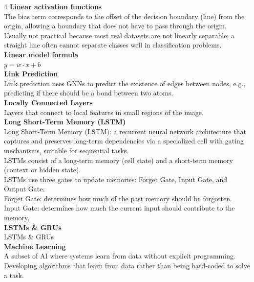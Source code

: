 \documentclass[8pt]{extarticle}
\begin{document}
\begin{multicols}{4}
{\vspace{2pt}\textbf{Linear activation functions}\\
The bias term corresponds to the offset of the decision boundary (line) from the origin, allowing a boundary that does not have to pass through the origin.\\
Usually not practical because most real datasets are not linearly separable; a straight line often cannot separate classes well in classification problems.\\
\vspace{2pt}\textbf{Linear model formula}\\
$y = w\cdot x + b$\\
\vspace{2pt}\textbf{Link Prediction}\\
Link prediction uses GNNs to predict the existence of edges between nodes, e.g., predicting if there should be a bond between two atoms.\\
\vspace{2pt}\textbf{Locally Connected Layers}\\
Layers that connect to local features in small regions of the image.\\
\vspace{2pt}\textbf{Long Short-Term Memory (LSTM)}\\
Long Short-Term Memory (LSTM): a recurrent neural network architecture that captures and preserves long-term dependencies via a specialized cell with gating mechanisms, suitable for sequential tasks.\\
LSTMs consist of a long-term memory (cell state) and a short-term memory (context or hidden state).\\
LSTMs use three gates to update memories: Forget Gate, Input Gate, and Output Gate.\\
Forget Gate: determines how much of the past memory should be forgotten.\\
Input Gate: determines how much the current input should contribute to the memory.\\
\vspace{2pt}\textbf{LSTMs \& GRUs}\\
LSTMs \& GRUs\\
\vspace{2pt}\textbf{Machine Learning}\\
A subset of AI where systems learn from data without explicit programming.\\
Developing algorithms that learn from data rather than being hard-coded to solve a task.\\
}
\end{multicols}
\end{document}

